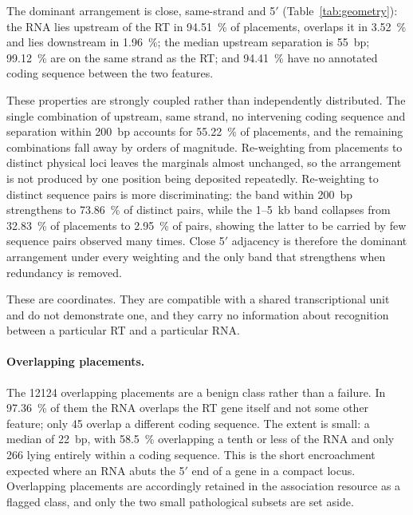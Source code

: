 The dominant arrangement is close, same-strand and 5$'$ (Table~\ref{tab:geometry}): the RNA lies
upstream of the RT in \SI{94.51}{\percent} of placements, overlaps it in \SI{3.52}{\percent} and
lies downstream in \SI{1.96}{\percent}; the median upstream separation is 55~bp; \SI{99.12}{\percent}
are on the same strand as the RT; and \SI{94.41}{\percent} have no annotated coding sequence between
the two features.

These properties are strongly coupled rather than independently distributed. The single combination
of upstream, same strand, no intervening coding sequence and separation within 200~bp accounts for
\SI{55.22}{\percent} of placements, and the remaining combinations fall away by orders of magnitude.
Re-weighting from placements to distinct physical loci leaves the marginals almost unchanged, so the
arrangement is not produced by one position being deposited repeatedly. Re-weighting to distinct
sequence pairs is more discriminating: the band within 200~bp strengthens to \SI{73.86}{\percent} of
distinct pairs, while the 1--5~kb band collapses from \SI{32.83}{\percent} of placements to
\SI{2.95}{\percent} of pairs, showing the latter to be carried by few sequence pairs observed many
times. Close 5$'$ adjacency is therefore the dominant arrangement under every weighting and the only
band that strengthens when redundancy is removed.

These are coordinates. They are compatible with a shared transcriptional unit and do not demonstrate
one, and they carry no information about recognition between a particular RT and a particular RNA.

\paragraph{Overlapping placements.} The \num{12124} overlapping placements are a benign class rather
than a failure. In \SI{97.36}{\percent} of them the RNA overlaps the RT gene itself and not some
other feature; only 45 overlap a different coding sequence. The extent is small: a median of 22~bp,
with \SI{58.5}{\percent} overlapping a tenth or less of the RNA and only 266 lying entirely within a
coding sequence. This is the short encroachment expected where an RNA abuts the 5$'$ end of a gene
in a compact locus. Overlapping placements are accordingly retained in the association resource as a
flagged class, and only the two small pathological subsets are set aside.

